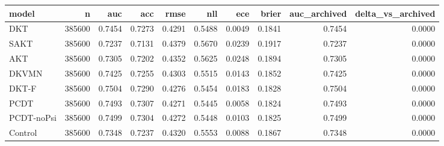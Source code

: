 \begin{tabular}{lrrrrrrrrr}
\toprule
model & n & auc & acc & rmse & nll & ece & brier & auc\_archived & delta\_vs\_archived \\
\midrule
DKT & 385600 & 0.7454 & 0.7273 & 0.4291 & 0.5488 & 0.0049 & 0.1841 & 0.7454 & 0.0000 \\
SAKT & 385600 & 0.7237 & 0.7131 & 0.4379 & 0.5670 & 0.0239 & 0.1917 & 0.7237 & 0.0000 \\
AKT & 385600 & 0.7305 & 0.7202 & 0.4352 & 0.5625 & 0.0248 & 0.1894 & 0.7305 & 0.0000 \\
DKVMN & 385600 & 0.7425 & 0.7255 & 0.4303 & 0.5515 & 0.0143 & 0.1852 & 0.7425 & 0.0000 \\
DKT-F & 385600 & 0.7504 & 0.7290 & 0.4276 & 0.5454 & 0.0183 & 0.1828 & 0.7504 & 0.0000 \\
PCDT & 385600 & 0.7493 & 0.7307 & 0.4271 & 0.5445 & 0.0058 & 0.1824 & 0.7493 & 0.0000 \\
PCDT-noPsi & 385600 & 0.7499 & 0.7304 & 0.4272 & 0.5448 & 0.0103 & 0.1825 & 0.7499 & 0.0000 \\
Control & 385600 & 0.7348 & 0.7237 & 0.4320 & 0.5553 & 0.0088 & 0.1867 & 0.7348 & 0.0000 \\
\bottomrule
\end{tabular}
